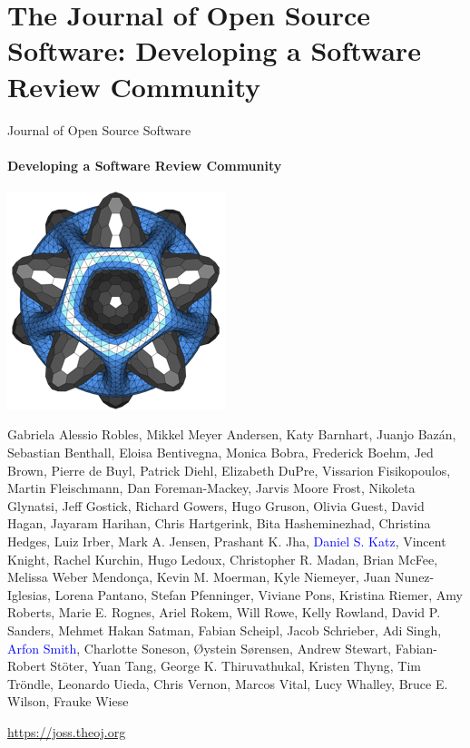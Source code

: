 \section{The Journal of Open Source Software: Developing a Software Review Community} %


\begin{frame}{Journal of Open Source Software}
\framesubtitle{Developing a Software Review Community}
\begin{center}
\includegraphics{joss.png}    
\end{center}

{\tiny
Gabriela Alessio Robles, Mikkel Meyer Andersen, Katy Barnhart, Juanjo Bazán, Sebastian Benthall, Eloisa Bentivegna,
Monica Bobra, Frederick Boehm, Jed Brown, Pierre de Buyl, Patrick Diehl, Elizabeth DuPre, Vissarion Fisikopoulos,
Martin Fleischmann, Dan Foreman-Mackey, Jarvis Moore Frost, Nikoleta Glynatsi, Jeff Gostick, Richard Gowers, Hugo Gruson,
Olivia Guest, David Hagan, Jayaram Harihan, Chris Hartgerink, Bita Hasheminezhad, Christina Hedges, Luiz Irber,
Mark A. Jensen, Prashant K. Jha, \textcolor{blue}{Daniel S. Katz}, Vincent Knight, Rachel Kurchin, Hugo Ledoux, Christopher R. Madan,
Brian McFee, Melissa Weber Mendonça, Kevin M. Moerman, Kyle Niemeyer, Juan Nunez-Iglesias, Lorena Pantano,
Stefan Pfenninger, Viviane Pons, Kristina Riemer, Amy Roberts, Marie E. Rognes, Ariel Rokem, Will Rowe, Kelly Rowland,
David P. Sanders, Mehmet Hakan Satman, Fabian Scheipl, Jacob Schrieber, Adi Singh, \textcolor{blue}{Arfon Smith}, Charlotte Soneson,
Øystein Sørensen, Andrew Stewart, Fabian-Robert Stöter, Yuan Tang, George K. Thiruvathukal, Kristen Thyng,
Tim Tröndle, Leonardo Uieda, Chris Vernon, Marcos Vital, Lucy Whalley, Bruce E. Wilson, Frauke Wiese}

\begin{center}
     \url{https://joss.theoj.org}
\end{center}

\end{frame}

